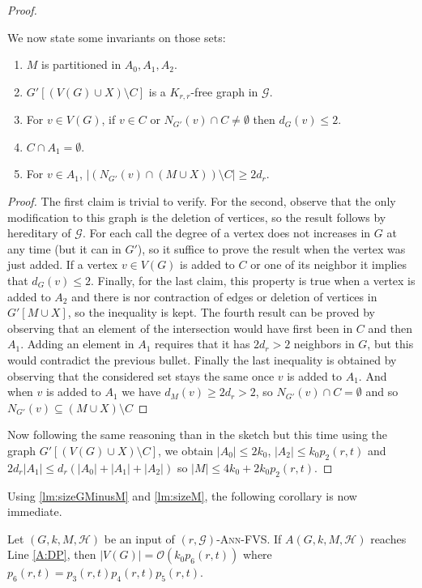 \documentclass{amsart}
\newcommand{\G}{\mathcal{G}}
\newcommand{\mH}{\mathcal{H}}
\newcommand{\AFVS}{\textsc{$(r,\G)$-Ann-FVS}\xspace}
\renewcommand{\O}{\mathcal{O}}
\begin{document}
\begin{proof}
\begin{itemize}
\end{itemize}
We now state some invariants on those sets:
\begin{claim}\mbox{}
\begin{enumerate}
    \item $M$ is partitioned in $A_0,A_1,A_2$.
    \item $G'[(V(G)\cup X)\setminus C]$ is a $K_{r,r}$-free graph in $\G$.
    \item For $v\in V(G)$, if $v\in C$ or $N_{G'}(v)\cap C\neq \emptyset$ then $d_G(v)\leq 2$.
    \item $C\cap A_1=\emptyset$.
    \item For $v\in A_1$, $|(N_{G'}(v)\cap (M \cup X)) \setminus C|\geq 2d_r$.
\end{enumerate}
\end{claim}
\begin{proof}
The first claim is trivial to verify.
For the second, observe that the only modification to this graph is the deletion of vertices, so the result follows by hereditary of $\G$. For each call the degree of a vertex does not increases in $G$ at any time (but it can in $G'$), so it suffice to prove the result when the vertex was just added. If a vertex $v\in V(G)$ is added to $C$ or one of its neighbor it implies that $d_G(v)\leq 2$.
Finally, for the last claim, this property is true when a vertex is added to $A_2$ and there is nor contraction of edges or deletion of vertices in $G'[M\cup X]$, so the inequality is kept. The fourth result can be proved by observing that an element of the intersection would have first been in $C$ and then $A_1$. Adding an element in $A_1$ requires that it has $2d_r>2$ neighbors in $G$, but this would contradict the previous bullet. Finally the last inequality is obtained by observing that the considered set stays the same once $v$ is added to $A_1$. And when $v$ is added to $A_1$ we have $d_M(v)\geq 2d_r>2$, so $N_{G'}(v)\cap C=\emptyset$ and so $N_{G'}(v)\subseteq (M\cup X)\setminus C$
\end{proof}
Now following the same reasoning than in the sketch but this time using the graph $G'[(V(G)\cup X)\setminus C]$, we obtain $|A_0|\leq 2k_0$, $|A_2|\leq k_0p_2(r,t)$ and $2d_r|A_1|\leq d_r(|A_0|+|A_1|+|A_2|)$ so $|M|\leq 4k_0+2k_0p_2(r,t)$.
\end{proof}

Using \autoref{lm:sizeGMinusM} and \autoref{lm:sizeM}, the following corollary is now immediate.

\begin{corollary}\label{lm:sizeG-end}
Let $(G,k,M,\mH)$ be an input of \AFVS.
If $A(G,k,M,\mH)$ reaches Line \ref{A:DP},
then $|V(G)|=\O(k_0p_6(r,t))$ where $p_6(r,t)=p_3(r,t)p_4(r,t)p_5(r,t)$.
\end{corollary}
\end{document}
